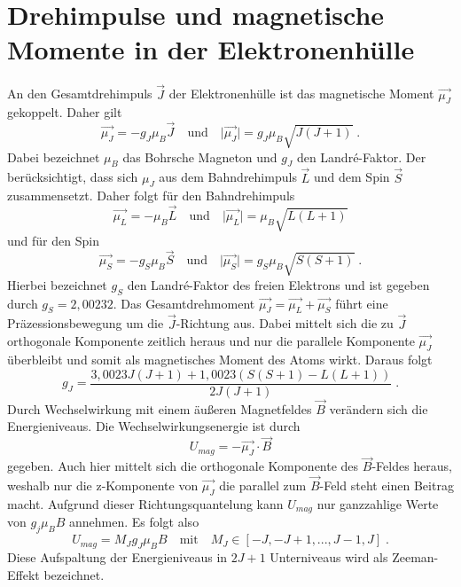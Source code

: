 \section{Drehimpulse und magnetische Momente in der Elektronenhülle}
An den Gesamtdrehimpuls $ \vec{J}$ der Elektronenhülle ist das magnetische Moment $\vec{\mu_J}$
gekoppelt. Daher gilt
\begin{equation}
\vec{\mu_J} = -g_J \mu_B \vec{J} \quad \text{und} \quad
\lvert \vec{\mu_J} \rvert = g_J \mu_B \sqrt{J(J+1)}  \; .
\label{eq:muJ}
\end{equation}
Dabei bezeichnet $\mu_B$ das Bohrsche Magneton und $g_J$ den Landr\'{e}-Faktor. Der berücksichtigt,
dass sich $\mu_J$ aus dem Bahndrehimpuls $\vec{L}$ und dem Spin $\vec{S}$ zusammensetzt.
Daher folgt für den Bahndrehimpuls
\begin{equation}
\vec{\mu_L} = - \mu_B \vec{L} \quad \text{und} \quad
\lvert \vec{\mu_L} \rvert =  \mu_B \sqrt{L(L+1)}
\label{eq:muL}
\end{equation}
und für den Spin
\begin{equation}
\vec{\mu_S} = - g_S \mu_B \vec{S} \quad \text{und} \quad
\lvert \vec{\mu_S} \rvert = 	g_S \mu_B \sqrt{S(S+1)} \; .
\label{eq:muS}
\end{equation}
Hierbei bezeichnet $g_S$ den Landr\'{e}-Faktor des freien Elektrons und ist gegeben durch
$ g_S = 2,00232$. Das Gesamtdrehmoment $\vec{\mu_J} = \vec{\mu_L}+\vec{\mu_S}$ führt eine
Präzessionsbewegung um die $\vec{J}$-Richtung aus. Dabei mittelt sich die zu $\vec{J}$
orthogonale Komponente zeitlich heraus und nur die parallele Komponente $\vec{\mu_J}$
überbleibt und somit als magnetisches Moment des Atoms wirkt. Daraus folgt
\begin{equation}
g_J = \frac{3,0023J(J+1) + 1,0023(S(S+1) - L(L+1))}{2J(J+1)}\; .
\label{eq:gJ}
\end{equation}
Durch Wechselwirkung mit einem äußeren Magnetfeldes $\vec{B}$ verändern sich die Energieniveaus.
Die Wechselwirkungsenergie ist durch
\begin{equation}
U_{mag} = - \vec{\mu_J} \cdot \vec{B}
\end{equation}
gegeben. Auch hier mittelt sich die orthogonale Komponente des $\vec{B}$-Feldes heraus, weshalb nur
die z-Komponente von $\vec{\mu_J}$  die parallel zum $\vec{B}$-Feld steht einen Beitrag macht.
Aufgrund dieser Richtungsquantelung kann $U_{mag}$ nur ganzzahlige Werte von $g_j \mu_B B$
annehmen. Es folgt also
\begin{equation}
U_{mag} = M_J g_J \mu_B B \quad \text{mit} \quad M_J \in [-J,-J+1,...,J-1,J] \; .
\end{equation}
Diese Aufspaltung der Energieniveaus in $2J+1$ Unterniveaus wird als Zeeman-Effekt bezeichnet.

